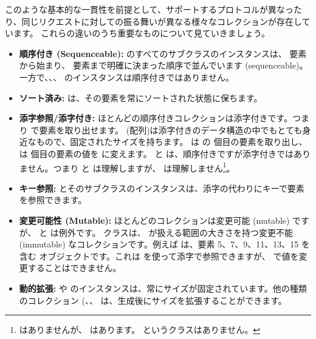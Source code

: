 \documentclass[a4paper,10pt,twoside]{book}
\begin{document}
このような基本的な一貫性を前提として、サポートするプロトコルが異なったり、同じリクエストに対しての振る舞いが異なる様々なコレクションが存在しています。
これらの違いのうち重要なものについて見ていきましょう。

\begin{itemize}
  \item {\bf 順序付き (Sequenceable):}
   のすべてのサブクラスのインスタンスは、 要素から始まり、 要素まで明確に決まった順序で並んでいます (sequenceable)。
  一方で、\mbox{、}\mbox{、} のインスタンスは順序付きではありません。

  \item {\bf ソート済み:}
   は、その要素を常にソートされた状態に保ちます。

  \item {\bf 添字参照/添字付き:}
        ほとんどの順序付きコレクションは添字付きです。つまり  で要素を取り出せます。
         (配列)は添字付きのデータ構造の中でもとても身近なもので、固定されたサイズを持ちます。 は  の  個目の要素を取り出し、 は  個目の要素の値を  に変えます。
         と  は、順序付きですが添字付きではありません。つまり  と  は理解しますが、 は理解しません\footnote{ はありませんが、 はあります。 というクラスはありません。}。

  \item {\bf キー参照:}
	 とそのサブクラスのインスタンスは、添字の代わりにキーで要素を参照できます。

  \item {\bf 変更可能性 (Mutable):}
        ほとんどのコレクションは変更可能 (mutable) ですが、 と  は例外です。
         クラスは、 が扱える範囲の大きさを持つ変更不能 (immutable) なコレクションです。例えば は、要素 5、7、9、11、13、15 を含む  オブジェクトです。これは  を使って添字で参照できますが、 で値を変更することはできません。

  \item {\bf 動的拡張:}
          や  のインスタンスは、常にサイズが固定されています。他の種類のコレクション (、、 は、生成後にサイズを拡張することができます。


\end{itemize}
\end{document}
